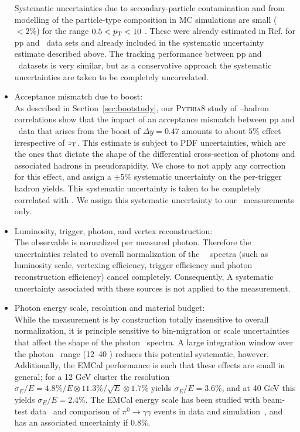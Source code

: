 \begin{itemize}
Systematic uncertainties due to secondary-particle contamination and from modelling of the particle-type composition in MC simulations are small ($<2\%$) for the range $0.5<p_{\mathrm{T}}<10$ \GeVc. These were already estimated in Ref.\cite{Acharya:2018qsh} for pp and \pPb~data sets and already included in the systematic uncertainty estimate described above. The tracking performance between pp and \pPb~datasets is very similar, but as a conservative approach the systematic uncertainties are taken to be completely uncorrelated.


\item Acceptance mismatch due to boost:\\
As described in Section~\ref{sec:bootstudy}, our \textsc{Pythia8} study of \gammaiso--hadron correlations show that the impact of an acceptance mismatch between pp and \pPb~data that arises from the boost of $\Delta y = 0.47$ amounts to about $5\%$ effect irrespective of $z_{\mathrm{T}}$. This estimate is subject to PDF uncertainties, which are the ones that dictate the shape of the differential cross-section of photons and associated hadrons in pseudorapidity. We chose to not apply any correction for this effect, and assign a $\pm$5$\%$ systematic uncertainty on the per-trigger hadron yields. This systematic uncertainty is taken to be completely correlated with \zt. We assign this systematic uncertainty to our \pPb~measurements only. 


\item Luminosity, trigger, photon, and vertex reconstruction:\\
The observable is normalized per measured photon. Therefore the uncertainties related to overall normalization of the \gammaiso~\pt~spectra (such as luminosity scale, vertexing efficiency, trigger efficiency and photon reconstruction efficiency) cancel completely. Consequently, A systematic uncertainty associated with these sources is not applied to the measurement. 

\item Photon energy scale, resolution and material budget:\\
  While the measurement is  by construction totally insensitive to overall normalization, it is principle sensitive to bin-migration or scale uncertainties that affect the shape of the photon \pt~spectra.  A large integration window over the photon \pt~range (12--40 \GeVc) reduces this potential systematic, however. Additionally, the EMCal performance is such that these effects are small in general; for a 12 GeV cluster the resolution  $\sigma_{E}/E = 4.8\%/E\otimes 11.3\%/\sqrt{E}\otimes 1.7\%$ yields $\sigma_{E}/E =3.6\%$, and at 40 GeV this yields $\sigma_{E}/E =2.4\%$. The EMCal energy scale has been studied with beam-test data~\cite{Allen:2009aa} and comparison of $\pi^{0}\to\gamma\gamma$ events in data and simulation~\cite{Adam:2016khe}, and has an associated uncertainty if 0.8$\%$. 


\end{itemize}
